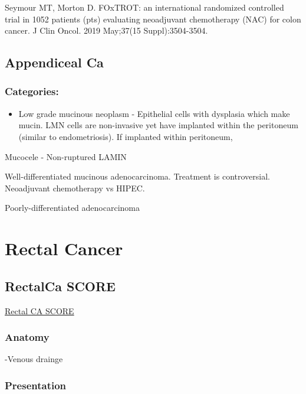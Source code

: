 \documentclass[
]{book}
\providecommand{\tightlist}{%
  \setlength{\itemsep}{0pt}\setlength{\parskip}{0pt}}
\begin{document}
Seymour MT, Morton D. FOxTROT: an international randomized controlled trial in 1052 patients (pts) evaluating neoadjuvant chemotherapy (NAC) for colon cancer. J Clin Oncol. 2019 May;37(15 Suppl):3504-3504.

\hypertarget{appendiceal-ca}{%
\chapter{Appendiceal Ca}\label{appendiceal-ca}}

\hypertarget{categories}{%
\section{Categories:}\label{categories}}

\begin{itemize}
\tightlist
\item
  Low grade mucinous neoplasm - Epithelial cells with dysplasia which make mucin. LMN cells are non-invasive yet have implanted within the peritoneum (similar to endometriosis). If implanted within peritoneum,
\end{itemize}

Mucocele - Non-ruptured LAMIN

Well-differentiated mucinous adenocarcinoma. Treatment is controversial. Neoadjuvant chemotherapy vs HIPEC.

Poorly-differentiated adenocarcinoma

\hypertarget{part-rectal-cancer}{%
\part*{Rectal Cancer}\label{part-rectal-cancer}}

\hypertarget{rectalca-score}{%
\chapter{RectalCa SCORE}\label{rectalca-score}}

\href{https://www.surgicalcore.org/modulecontent.aspx?id=130244}{Rectal CA SCORE}

\hypertarget{anatomy}{%
\section{Anatomy}\label{anatomy}}

-Venous drainge

\hypertarget{presentation}{%
\section{Presentation}\label{presentation}}
\end{document}
